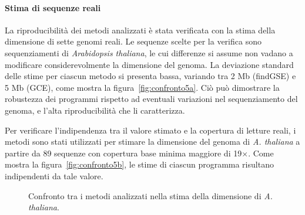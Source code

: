 \documentclass[crop=false, class=book]{standalone}
\begin{document}
 	\paragraph{Stima di sequenze reali}
 	La riproducibilità dei metodi analizzati è stata verificata con la stima della dimensione di sette genomi reali. Le sequenze scelte per la verifica sono sequenziamenti di \textit{Arabidopsis thaliana}, le cui differenze si assume non vadano a modificare considerevolmente la dimensione del genoma. La deviazione standard delle stime per ciascun metodo si presenta bassa, variando tra 2 Mb (findGSE) e 5 Mb (GCE), come mostra la figura~\vref{fig:confronto5a}. Ciò può dimostrare la robustezza dei programmi rispetto ad eventuali variazioni nel sequenziamento del genoma, e l'alta riproducibilità che li caratterizza.

 	Per verificare l'indipendenza tra il valore stimato e la copertura di letture reali, i metodi sono stati utilizzati per stimare la dimensione del genoma di \textit{A. thaliana} a partire da 89 sequenze con copertura base minima maggiore di 19$\times$. Come mostra la figura~\vref{fig:confronto5b}, le stime di ciascun programma risultano indipendenti da tale valore.
 	
 	\begin{figure}[p]
 		\centering
 		 \qquad 
 		\caption{Confronto tra i metodi analizzati nella stima della dimensione di \textit{A. thaliana}.}
 		\label{fig:confronto5}
 	\end{figure}
 
\end{document}
